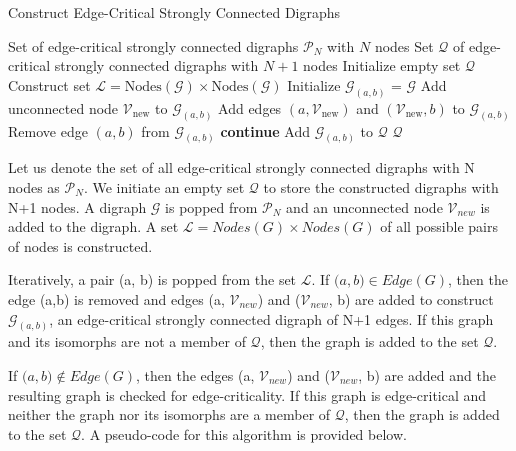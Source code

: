 \documentclass[runningheads]{llncs}
\begin{document}
\begin{algorithm}
\caption{Construct Edge-Critical Strongly Connected Digraphs}
\begin{algorithmic}[1]
\REQUIRE Set of edge-critical strongly connected digraphs $\mathcal{P}_N$ with $N$ nodes
\ENSURE Set $\mathcal{Q}$ of edge-critical strongly connected digraphs with $N+1$ nodes
\STATE Initialize empty set $\mathcal{Q}$
    \STATE Construct set $\mathcal{L} = \text{Nodes}(\mathcal{G}) \times \text{Nodes}(\mathcal{G})$
        \STATE Initialize $\mathcal{G}_{(a, b)}$ = $\mathcal{G}$
        \STATE Add unconnected node $\mathcal{V}_{\text{new}}$ to $\mathcal{G}_{(a, b)}$
        \STATE Add edges $(a, \mathcal{V}_{\text{new}})$ and $(\mathcal{V}_{\text{new}}, b)$  to $\mathcal{G}_{(a, b)}$
            \STATE Remove edge $(a, b)$ from $\mathcal{G}_{(a, b)}$
        \ELSE
                \STATE \textbf{continue}
            \ENDIF
        \ENDIF
            \STATE Add $\mathcal{G}_{(a, b)}$ to $\mathcal{Q}$
        \ENDIF
    \ENDFOR
\ENDFOR
\RETURN $\mathcal{Q}$
\end{algorithmic}
\end{algorithm}

Let us denote the set of all edge-critical strongly connected digraphs with N nodes as $\mathcal{P}_N$. We initiate an empty set $\mathcal{Q}$ to store the constructed digraphs with N+1 nodes. A digraph $\mathcal{G}$ is popped from $\mathcal{P}_N$ and an unconnected node $\mathcal{V}_{new}$ is added to the digraph. A set $\mathcal{L = }Nodes({G}) {\times} Nodes ({G})$ of all possible pairs of nodes is constructed. 

Iteratively, a pair (a, b) is popped from the set $\mathcal{L}$. If $\mathcal (a,b) \in Edge({G})$, then the edge (a,b) is removed and edges (a, $\mathcal{V}_{new}$) and ($\mathcal{V}_{new}$, b) are added to construct $\mathcal{G}_{(a, b)}$, an edge-critical strongly connected digraph of N+1 edges. If this graph and its isomorphs are not a member of $\mathcal{Q}$, then the graph is added to the set $\mathcal{Q}$.

If $\mathcal (a,b) \notin Edge({G})$, then the edges (a, $\mathcal{V}_{new}$) and ($\mathcal{V}_{new}$, b) are added and the resulting graph is checked for edge-criticality. If this graph is edge-critical and neither the graph nor its isomorphs are a member of $\mathcal{Q}$, then the graph is added to the set $\mathcal{Q}$. A pseudo-code for this algorithm is provided below.
\end{document}
